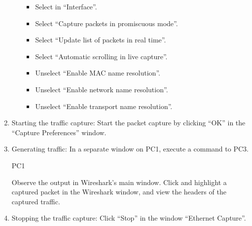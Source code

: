 \begin{enumerate}
\begin{minipage}{\linewidth}
\begin{framed}
\begin{enumerate}
\begin{itemize}
							\item Select  in ``Interface''.
							\item Select ``Capture packets in promiscuous mode''.
							\item Select ``Update list of packets in real time''.
							\item Select ``Automatic scrolling in live capture''.
							\item Unselect ``Enable MAC name resolution''.
							\item Unselect ``Enable network name resolution''.
							\item Unselect ``Enable transport name resolution''.
						\end{itemize}
				\end{enumerate}
			\end{framed}
			\label{fig:lab1-capture-options}
		\end{minipage}

	\item Starting the traffic capture: Start the packet capture by clicking ``OK'' in the ``Capture Preferences'' window.

	\item Generating traffic: In a separate window on PC1, execute a  command to PC3.
		\begin{cmdblock}
	PC1%
		\end{cmdblock}
		Observe the output in Wireshark's main window.
		Click and highlight a captured packet in the Wireshark window, and view the headers of the captured traffic.

	\item Stopping the traffic capture: Click ``Stop'' in the window ``Ethernet Capture''.


\end{enumerate}
